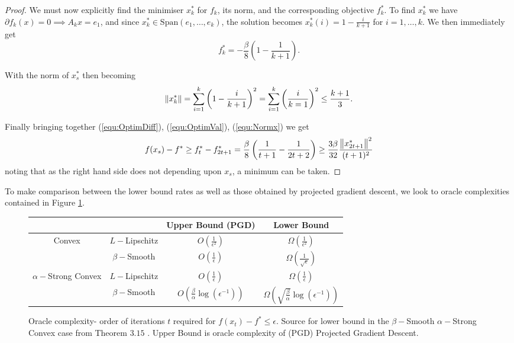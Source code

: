 \begin{proof}
We must now explicitly find the minimiser $x^*_k$ for $f_k$, its norm, and the corresponding objective $f_k^*$. To find $x_k^*$ we have $\partial f_k(x) = 0 \implies A_k x = e_1$, and since $x_k^* \in \text{Span}(e_1,\dots,e_k)$, the solution becomes $x_k^*(i) = 1  - \frac{i}{k+1}$ for $i=1,\dots,k$. We then immediately get
\begin{equation}
f_k^* = - \frac{\beta}{8}\left( 1 - \frac{1}{k+1}\right).
\label{equ:OptimVal}
\end{equation}

With the norm of $x_s^*$ then becoming
\begin{equation}
    \left\lVert x_k^*\right\rVert = \sum_{i=1}^k \left( 1 - \frac{i}{k+1}\right)^2 = \sum_{i=1}^k \left( \frac{i}{k=1}\right)^2 \leq \frac{k+1}{3}.
\label{equ:Normx}
\end{equation}

Finally bringing together (\ref{equ:OptimDiff}), (\ref{equ:OptimVal}), (\ref{equ:Normx}) we get
\begin{equation*}
    f(x_s)- f^* \geq f_t^* - f_{2t + 1}^* = \frac{\beta}{8}\left( \frac{1}{t+1} - \frac{1}{2t + 2}\right) \geq \frac{3 \beta}{32} \frac{\left\lVert x_{2t + 1}^*\right\rVert^2}{(t+1)^2}
\end{equation*}
noting that as the right hand side does not depending upon $x_s$, a minimum can be taken.
\end{proof}

To make comparison between the lower bound rates as well as those obtained by projected gradient descent, we look to oracle complexities contained in Figure \ref{tab:RatesUpperVsLower}.

\begin{figure}[h]
\begin{center}
\begin{tabular}{ c|c|c|c| }
& & Upper Bound (PGD) & Lower Bound \\
\hline
\multirow{2}{4em}{Convex} & $L-$Lipschitz
& $O\left(\frac{1}{\epsilon^2} \right)$ &
$\Omega\left(\frac{1}{\epsilon^2} \right)$  \\ 

& $\beta-$Smooth & $O\left(\frac{1}{\epsilon}\right)$  &
$\Omega\left( \frac{1}{\sqrt{\epsilon}} \right) $ \\ 
\hline
\multirow{2}{4em}{$\alpha-$Strong Convex} & $L-$Lipschitz
& $O\left( \frac{1}{\epsilon}\right)$ &
$ \Omega\left( \frac{1}{\epsilon} \right) $ \\ 
& $\beta-$Smooth & $O\left(\frac{\beta}{\alpha}\log\left( \epsilon^{-1} \right)\right) $ &
$\Omega\left(\sqrt{\frac{\beta}{\alpha}}\log\left( \epsilon^{-1} \right)\right)  $  \\ 
\end{tabular}
\caption{Oracle complexity- order of iterations $t$ required for $f(x_t) - f^* \leq \epsilon$. Source for lower bound in the $\beta-$Smooth $\alpha-$Strong Convex case from Theorem $3.15$ \cite{bubeck}. Upper Bound is oracle complexity of (PGD) Projected Gradient Descent. }
\label{tab:RatesUpperVsLower}
\end{center}
\end{figure}

